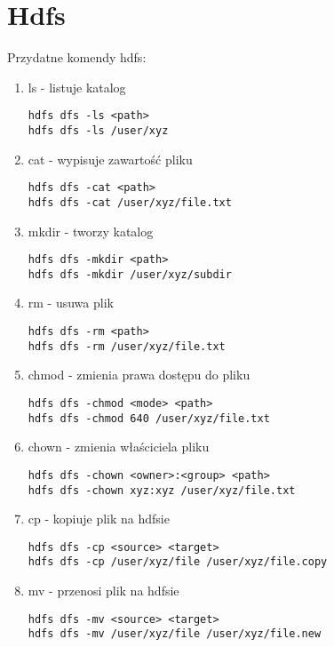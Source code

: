 \documentclass[11pt]{article}
\begin{document}
\section*{Hdfs}

Przydatne komendy hdfs:
\begin{enumerate}
\item ls - listuje katalog
\begin{lstlisting}
hdfs dfs -ls <path>
hdfs dfs -ls /user/xyz
\end{lstlisting}

\item cat - wypisuje zawartość pliku
\begin{lstlisting}
hdfs dfs -cat <path>
hdfs dfs -cat /user/xyz/file.txt
\end{lstlisting}

\item mkdir - tworzy katalog
\begin{lstlisting}
hdfs dfs -mkdir <path>
hdfs dfs -mkdir /user/xyz/subdir
\end{lstlisting}
 
\item rm - usuwa plik
\begin{lstlisting}
hdfs dfs -rm <path>
hdfs dfs -rm /user/xyz/file.txt
\end{lstlisting}

\item chmod - zmienia prawa dostępu do pliku
\begin{lstlisting}
hdfs dfs -chmod <mode> <path>
hdfs dfs -chmod 640 /user/xyz/file.txt
\end{lstlisting}

\item chown - zmienia właściciela pliku
\begin{lstlisting}
hdfs dfs -chown <owner>:<group> <path>
hdfs dfs -chown xyz:xyz /user/xyz/file.txt
\end{lstlisting}

\item cp - kopiuje plik na hdfsie
\begin{lstlisting}
hdfs dfs -cp <source> <target>
hdfs dfs -cp /user/xyz/file /user/xyz/file.copy
\end{lstlisting}

\pagebreak

\item mv - przenosi plik na hdfsie
\begin{lstlisting}
hdfs dfs -mv <source> <target>
hdfs dfs -mv /user/xyz/file /user/xyz/file.new
\end{lstlisting}


\end{enumerate}
\end{document}
